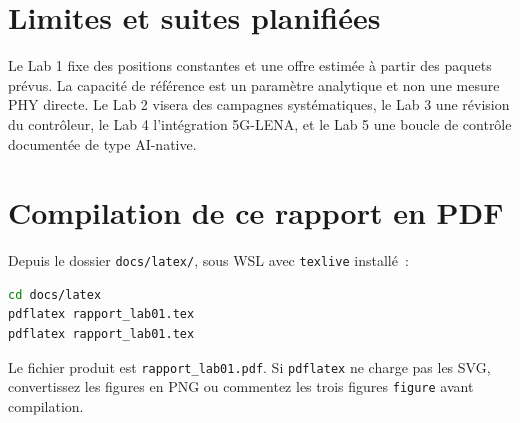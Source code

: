 \documentclass[11pt,a4paper]{article}
\begin{document}
\section{Limites et suites planifiées}

Le Lab 1 fixe des positions constantes et une offre estimée à partir des paquets prévus. La capacité de référence est un paramètre analytique et non une mesure PHY directe. Le Lab 2 visera des campagnes systématiques, le Lab 3 une révision du contrôleur, le Lab 4 l'intégration 5G-LENA, et le Lab 5 une boucle de contrôle documentée de type AI-native.

\section{Compilation de ce rapport en PDF}

Depuis le dossier \texttt{docs/latex/}, sous WSL avec \texttt{texlive} installé~:

\begin{lstlisting}[language=bash]
cd docs/latex
pdflatex rapport_lab01.tex
pdflatex rapport_lab01.tex
\end{lstlisting}

Le fichier produit est \texttt{rapport\_lab01.pdf}. Si \texttt{pdflatex} ne charge pas les SVG, convertissez les figures en PNG ou commentez les trois figures \texttt{figure} avant compilation.
\end{document}
